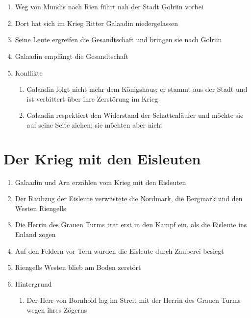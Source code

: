 \documentclass[12pt,a4paper,onecolumn,twoside,ngerman]{book}
\newcommand{\Tern}{Tern}
\newcommand{\Enland}{Enland}
\newcommand{\Schattenlaufer}{Schattenläufer}
\newcommand{\Nordmark}{Nordmark}
\newcommand{\Bergmark}{Bergmark}
\newcommand{\Bornhold}{Bornhold}
\newcommand{\Arn}{Arn}
\newcommand{\Eisleute}{Eisleute}
\newcommand{\Rhingell}{Riengell}
\newcommand{\Mundis}{Mundis}
\newcommand{\Golrin}{Golriin}
\newcommand{\Galadin}{Galaadin}
\newcommand{\Rhin}{Rien}
\begin{document}
\section[Der Weg am Fluss]{}
\begin{enumerate}
  \item Weg von {\Mundis} nach {\Rhin} führt nah der Stadt {\Golrin} vorbei
  \item Dort hat sich im Krieg Ritter {\Galadin} niedergelassen
  \item Seine Leute ergreifen die Gesandtschaft und bringen sie nach {\Golrin}
  \item {\Galadin} empfängt die Gesandtschaft
  \item Konflikte
  \begin{enumerate}
    \item {\Galadin} folgt nicht mehr dem Königshaus; er stammt aus der Stadt und ist verbittert über ihre Zerstörung im Krieg
    \item {\Galadin} respektiert den Widerstand der {\Schattenlaufer} und möchte sie auf seine Seite ziehen; sie möchten aber nicht
  \end{enumerate}
\end{enumerate}

\section[Galadin und Arn erzählen vom Krieg mit den Eisleuten]{Der Krieg mit den Eisleuten}
\begin{enumerate}
  \item {\Galadin} und {\Arn} erzählen vom Krieg mit den Eisleuten
  \item Der  Raubzug der {\Eisleute} verwüstete die {\Nordmark}, die {\Bergmark} und den Westen {\Rhingell}s
  \item Die Herrin des Grauen Turms trat erst in den Kampf ein, als die {\Eisleute} ins {\Enland} zogen
  \item Auf den Feldern vor {\Tern} wurden die {\Eisleute} durch Zauberei besiegt
  \item {\Rhingell}s Westen blieb am Boden zerstört
  \item Hintergrund
  \begin{enumerate}
    \item Der Herr von {\Bornhold} lag im Streit mit der Herrin des Grauen Turms wegen ihres Zögerns 
  \end{enumerate}
\end{enumerate}
 
\end{document}
